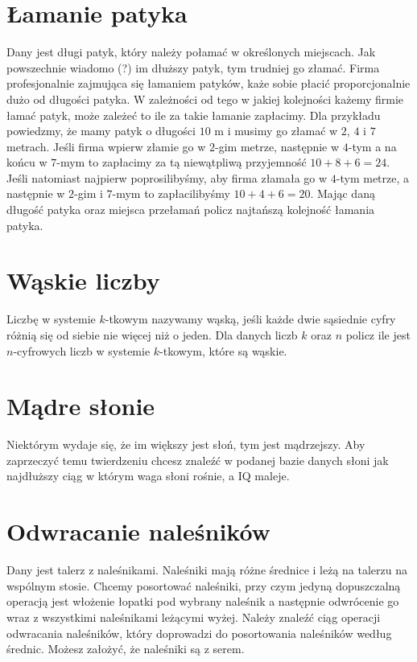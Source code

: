\section*{Łamanie patyka}

Dany jest długi patyk, który należy połamać w określonych miejscach.
Jak powszechnie wiadomo (?) im dłuższy patyk, tym  trudniej go złamać.
Firma profesjonalnie zajmująca się łamaniem patyków, każe sobie płacić proporcjonalnie dużo od długości patyka.
W zależności od tego w jakiej kolejności każemy firmie łamać patyk, może zależeć to ile za takie łamanie zapłacimy.
Dla przykładu powiedzmy, że mamy patyk o długości $10$ m i musimy go złamać w $2$, $4$ i $7$ metrach.
Jeśli firma wpierw złamie go w $2$-gim metrze, następnie w $4$-tym a na końcu w $7$-mym to zapłacimy za tą niewątpliwą przyjemność $10 + 8 + 6 = 24$.
Jeśli natomiast najpierw poprosilibyśmy, aby firma złamała go w $4$-tym metrze, a następnie w $2$-gim i $7$-mym to zapłacilibyśmy $10 + 4 + 6 = 20$.
Mając daną długość patyka oraz miejsca przełamań policz najtańszą kolejność łamania patyka.

\section*{Wąskie liczby}

Liczbę w systemie $k$-tkowym nazywamy wąską, jeśli każde dwie sąsiednie cyfry różnią się od siebie nie więcej niż o jeden.
Dla danych liczb $k$ oraz $n$ policz ile jest $n$-cyfrowych liczb w systemie $k$-tkowym, które są wąskie.

\section*{Mądre słonie}

Niektórym wydaje się, że im większy jest słoń, tym jest mądrzejszy.
Aby zaprzeczyć temu twierdzeniu chcesz znaleźć w podanej bazie danych słoni jak najdłuższy ciąg w którym waga słoni rośnie, a IQ maleje.

\section*{Odwracanie naleśników}

Dany jest talerz z naleśnikami.
Naleśniki mają różne średnice i leżą na talerzu na wspólnym stosie.
Chcemy posortować naleśniki, przy czym jedyną dopuszczalną operacją jest włożenie łopatki pod wybrany naleśnik a następnie odwrócenie go wraz z wszystkimi naleśnikami leżącymi wyżej.
Należy znaleźć ciąg operacji odwracania naleśników, który doprowadzi do posortowania naleśników według średnic.
Możesz założyć, że naleśniki są z serem.

